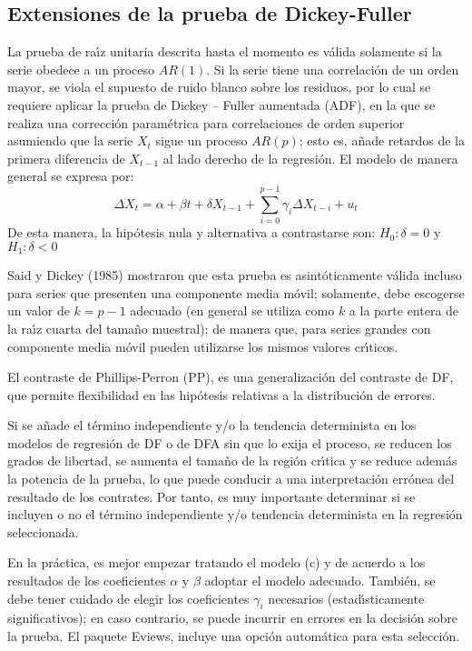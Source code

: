 \subsection{Extensiones de la prueba de Dickey-Fuller}

La prueba de ra\'{\i}z unitaria descrita hasta el momento es v\'{a}lida 
solamente si la serie obedece a un proceso $AR(1)$. Si la serie tiene una 
correlaci\'{o}n de un orden mayor, se viola el supuesto de ruido blanco 
sobre los residuos, por lo cual se requiere aplicar la prueba de Dickey -- 
Fuller aumentada 
(ADF), en la que se realiza una correcci\'{o}n param\'{e}trica para 
correlaciones de orden superior asumiendo que la serie $X_{t}$ sigue un 
proceso $AR(p)$; esto es, a\~{n}ade retardos de la primera diferencia de 
$X_{t-1}$ al lado derecho de la regresi\'{o}n. El modelo de manera general 
se expresa por:
\[
\Delta X_{t}=\alpha +\beta t+\delta X_{t-1}+\sum_{i=0}^{p-1} {\gamma 
_{i}\Delta X_{t-i}} +u_{t}
\]
De esta manera, la hip\'{o}tesis nula y alternativa a contrastarse son: 
$H_{0}:\delta =0$ y $H_{1}:\delta <0$

Said y Dickey (1985) mostraron que esta prueba es asint\'{o}ticamente 
v\'{a}lida incluso para series que presenten una componente media m\'{o}vil; 
solamente, debe escogerse un valor de $k=p-1$ adecuado (en general se 
utiliza como $k$ a la parte entera de la ra\'{\i}z cuarta del tama\~{n}o 
muestral); de manera que, para series grandes con componente media m\'{o}vil 
pueden utilizarse los mismos valores cr\'{\i}ticos.

El contraste de Phillips-Perron (PP), es una generalizaci\'{o}n del 
contraste de DF, que permite flexibilidad en las hip\'{o}tesis relativas a 
la distribuci\'{o}n de errores.

\begin{observacion}
Si se a\~{n}ade el t\'{e}rmino independiente 
y/o la tendencia determinista en los modelos de regresi\'{o}n de DF o de DFA 
sin que lo exija el proceso, se reducen los grados de libertad, se aumenta 
el tama\~{n}o de la regi\'{o}n cr\'{\i}tica y se reduce adem\'{a}s la 
potencia de la prueba, lo que puede conducir a una interpretaci\'{o}n 
err\'{o}nea del resultado de los contrates. Por tanto, es muy importante 
determinar si se incluyen o no el t\'{e}rmino independiente y/o tendencia 
determinista en la regresi\'{o}n seleccionada. 

En la pr\'{a}ctica, es mejor empezar tratando el modelo (c) y de acuerdo a 
los resultados de los coeficientes $\alpha$   y  $\beta $ 
adoptar el modelo adecuado. Tambi\'{e}n, se debe tener cuidado de elegir los 
coeficientes $\gamma_{i}$ necesarios (estad\'{\i}sticamente 
significativos); en caso contrario, se puede incurrir en errores en la 
decisi\'{o}n sobre la prueba. El paquete Eviews, incluye una opci\'{o}n 
autom\'{a}tica para esta selecci\'{o}n.
\end{observacion}

